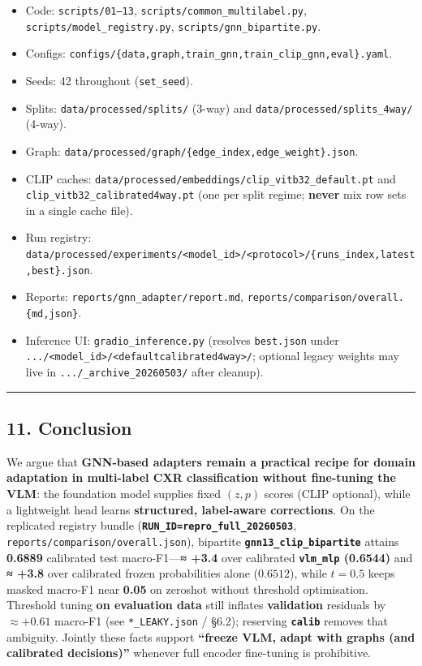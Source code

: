 \documentclass[
  11pt,
]{article}
\providecommand{\tightlist}{%
  \setlength{\itemsep}{0pt}\setlength{\parskip}{0pt}}
\begin{document}
\begin{itemize}
\tightlist
\item
  Code: \texttt{scripts/01–13}, \texttt{scripts/common\_multilabel.py},
  \texttt{scripts/model\_registry.py},
  \texttt{scripts/gnn\_bipartite.py}.
\item
  Configs:
  \texttt{configs/\{data,graph,train\_gnn,train\_clip\_gnn,eval\}.yaml}.
\item
  Seeds: 42 throughout (\texttt{set\_seed}).
\item
  Splits: \texttt{data/processed/splits/} (3-way) and
  \texttt{data/processed/splits\_4way/} (4-way).
\item
  Graph:
  \texttt{data/processed/graph/\{edge\_index,edge\_weight\}.json}.
\item
  CLIP caches:
  \texttt{data/processed/embeddings/clip\_vitb32\_default.pt} and
  \texttt{clip\_vitb32\_calibrated4way.pt} (one per split regime;
  \textbf{never} mix row sets in a single cache file).
\item
  Run registry:
  \texttt{data/processed/experiments/\textless{}model\_id\textgreater{}/\textless{}protocol\textgreater{}/\{runs\_index,latest,best\}.json}.
\item
  Reports: \texttt{reports/gnn\_adapter/report.md},
  \texttt{reports/comparison/overall.\{md,json\}}.
\item
  Inference UI: \texttt{gradio\_inference.py} (resolves
  \texttt{best.json} under
  \texttt{.../\textless{}model\_id\textgreater{}/\textless{}default\textbar{}calibrated4way\textgreater{}/};
  optional legacy weights may live in \texttt{.../\_archive\_20260503/}
  after cleanup).
\end{itemize}

\begin{center}\rule{0.5\linewidth}{0.5pt}\end{center}

\subsection{11. Conclusion}\label{conclusion}

We argue that \textbf{GNN-based adapters remain a practical recipe for
domain adaptation in multi-label CXR classification without fine-tuning
the VLM}: the foundation model supplies fixed \((z,p)\) scores (CLIP
optional), while a lightweight head learns \textbf{structured,
label-aware corrections}. On the replicated registry bundle
(\textbf{\texttt{RUN\_ID=repro\_full\_20260503}},
\texttt{reports/comparison/overall.json}), bipartite
\textbf{\texttt{gnn13\_clip\_bipartite}} attains \textbf{0.6889}
calibrated test macro-F1---\textbf{≈ +3.4} over calibrated
\textbf{\texttt{vlm\_mlp} (0.6544)} and \textbf{≈ +3.8} over calibrated
frozen probabilities alone (\textbf{\(0.6512\)}), while
\textbf{\(t{=}0.5\)} keeps masked macro-F1 near \textbf{0.05} on
zeroshot without threshold optimisation. Threshold tuning \textbf{on
evaluation data} still inflates \textbf{validation} residuals by
\(\approx +0.61\) macro-F1 (see \texttt{*\_LEAKY.json} / §6.2);
reserving \textbf{\texttt{calib}} removes that ambiguity. Jointly these
facts support \textbf{``freeze VLM, adapt with graphs (and calibrated
decisions)''} whenever full encoder fine-tuning is prohibitive.
\end{document}
